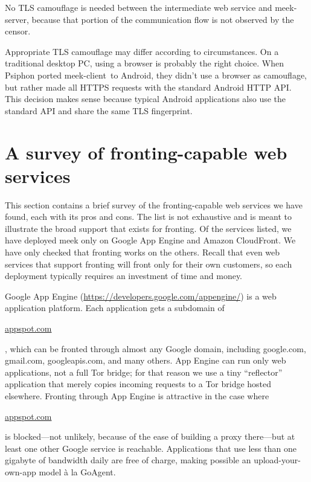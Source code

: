 \documentclass[conference]{IEEEtran}
\def\meekclient{\mbox{meek-client}}
\def\meekserver{\mbox{meek-server}}
\def\meek{meek}
\def\urll#1{\begin{NoHyper}\url{#1}\end{NoHyper}}
\begin{document}

No TLS camouflage is needed between the intermediate web service and \meekserver,
because that portion of the communication flow is not observed by the censor.

Appropriate TLS camouflage may differ according to circumstances.
On a traditional desktop PC, using a browser is probably the right choice.
When Psiphon ported \meekclient\ to Android,
they didn't use a browser as camouflage,
but rather made all HTTPS requests with the standard Android HTTP API.
This decision makes sense because typical Android applications
also use the standard API and share the same TLS fingerprint.

\section{A survey of fronting-capable web services}
\label{sec:survey}

This section contains a brief survey of the fronting-capable
web services we have found, each with its pros and cons.
The list is not exhaustive and is meant to illustrate the broad
support that exists for fronting.
Of the services listed, we have deployed \meek
only on Google App Engine and Amazon CloudFront.
We have only checked that fronting works on the others.
Recall that even web services that support fronting
will front only for their own customers,
so each deployment typically requires an investment of time and money.

Google App Engine (\url{https://developers.google.com/appengine/})
is a web application platform.
Each application gets a subdomain of \urll{appspot.com},
which can be fronted through almost any Google domain,
including google.com, gmail.com, googleapis.com, and many others.
App Engine can run only web applications,
not a full Tor bridge;
for that reason we use a tiny ``reflector'' application
that merely copies incoming requests to a Tor bridge hosted elsewhere.
Fronting through App Engine is attractive in the case where
\urll{appspot.com} is blocked---not unlikely,
because of the ease of building a proxy there---but
at least one other Google service is reachable.
Applications that use less than one gigabyte of bandwidth daily
are free of charge,
making possible an upload-your-own-app model
à la GoAgent.
\end{document}
